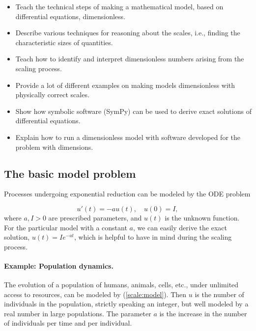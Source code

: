 \documentclass[graybox,envcountchap,sectrefs,final]{svmonodo}
\begin{document}
\begin{itemize}
 \item Teach the technical steps of making a mathematical model, based
   on differential equations, dimensionless.

 \item Describe various techniques for reasoning about the scales, i.e.,
   finding the characteristic sizes of quantities.

 \item Teach how to identify and interpret dimensionless numbers arising
   from the scaling process.

 \item Provide a lot of different examples on making models dimensionless
   with physically correct scales.

 \item Show how symbolic software (SymPy) can be used
   to derive exact solutions of differential equations.

 \item Explain how to run a dimensionless model with software developed
   for the problem with dimensions.
\end{itemize}

\noindent
\subsection{The basic model problem}

Processes undergoing exponential reduction can be modeled by the ODE
problem

\begin{equation}
u'(t) = -au(t),\quad u(0)=I,
\label{scale:model}
\end{equation}
where $a,I>0$ are prescribed parameters, and $u(t)$ is the unknown function.
For the particular model with a constant $a$, we can easily derive the exact
solution, $u(t)=Ie^{-at}$,
which is helpful to have in mind during the scaling process.

\paragraph{Example: Population dynamics.}
The evolution of a population of humans, animals, cells, etc.,
under unlimited access to resources, can be
modeled by (\ref{scale:model}). Then $u$ is the number of
individuals in the population, strictly speaking an integer, but well
modeled by a real number in large populations.
The parameter $a$ is the increase in the number of individuals per
time and per individual.
\end{document}
